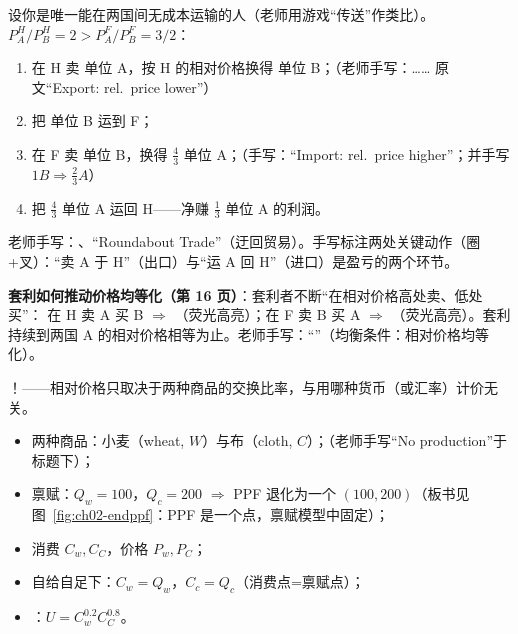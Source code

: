 \begin{exbox}
设你是唯一能在两国间无成本运输的人（老师用游戏``传送''作类比）。$P_A^H/P_B^H = 2 > P_A^F/P_B^F = 3/2$：
\begin{enumerate}
  \item 在 H 卖  单位 A，按 H 的相对价格换得  单位 B；（老师手写：…… 原文``Export: rel.\ price lower''）
  \item 把  单位 B 运到 F；
  \item 在 F 卖  单位 B，换得 $\frac{4}{3}$ 单位 A；（手写：``Import: rel.\ price higher''；并手写 $1B \Rightarrow \frac{2}{3}A$）
  \item 把 $\frac{4}{3}$ 单位 A 运回 H——净赚 $\frac{1}{3}$ 单位 A 的利润。
\end{enumerate}
老师手写：、``Roundabout Trade''（迂回贸易）。手写标注两处关键动作（圈+叉）：``卖 A 于 H''（出口）与``运 A 回 H''（进口）是盈亏的两个环节。

\textbf{套利如何推动价格均等化（第 16 页）}：套利者不断``在相对价格高处卖、低处买''：
在 H 卖 A 买 B $\Rightarrow$ （荧光高亮）；在 F 卖 B 买 A $\Rightarrow$ （荧光高亮）。套利持续到两国 A 的相对价格相等为止。老师手写：``''（均衡条件：相对价格均等化）。
\end{exbox}

\begin{intubox}[重要讨论（第 17 页）]
！——相对价格只取决于两种商品的交换比率，与用哪种货币（或汇率）计价无关。
\end{intubox}


\begin{assumpbox}[禀赋模型设定（第 19--21 页）]
\begin{itemize}
  \item 两种商品：小麦（wheat, $W$）与布（cloth, $C$）；（老师手写``No production''于标题下）；
  \item 禀赋：$Q_w = 100$，$Q_c = 200$ $\Rightarrow$ PPF 退化为一个 $(100, 200)$（板书见图~\ref{fig:ch02-endppf}：PPF 是一个点，禀赋模型中固定）；
  \item 消费 $C_w, C_C$，价格 $P_w, P_C$；
  \item 自给自足下：$C_w = Q_w$，$C_c = Q_c$（消费点=禀赋点）；
  \item {}：$U = C_w^{0.2} C_C^{0.8}$。
\end{itemize}
\end{assumpbox}

